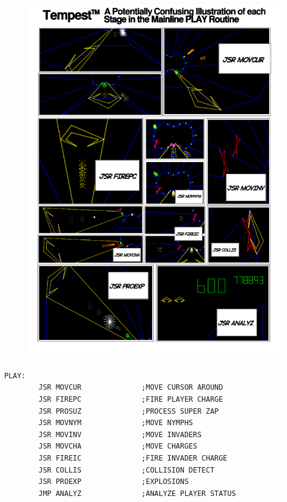 \begin{figure}[H]
      \centering
      \includegraphics[width=14cm]{src/mainline/mainline-comic.png}%
\end{figure}

\begin{lstlisting}
PLAY:
        JSR MOVCUR              ;MOVE CURSOR AROUND
        JSR FIREPC              ;FIRE PLAYER CHARGE
        JSR PROSUZ              ;PROCESS SUPER ZAP
        JSR MOVNYM              ;MOVE NYMPHS
        JSR MOVINV              ;MOVE INVADERS
        JSR MOVCHA              ;MOVE CHARGES
        JSR FIREIC              ;FIRE INVADER CHARGE
        JSR COLLIS              ;COLLISION DETECT
        JSR PROEXP              ;EXPLOSIONS
        JMP ANALYZ              ;ANALYZE PLAYER STATUS
\end{lstlisting}

